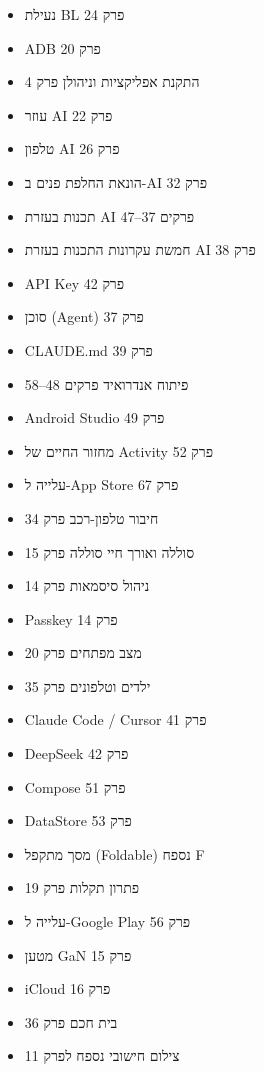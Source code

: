 


\begin{itemize}
  \item נעילת BL פרק 24
  \item ADB פרק 20
  \item התקנת אפליקציות וניהולן פרק 4
  \item עוזר AI פרק 22
  \item טלפון AI פרק 26
  \item הונאת החלפת פנים ב-AI פרק 32
  \item תכנות בעזרת AI פרקים 37–47
  \item חמשת עקרונות התכנות בעזרת AI פרק 38
  \item API Key פרק 42
  \item סוכן (Agent) פרק 37
  \item CLAUDE.md פרק 39
  \item פיתוח אנדרואיד פרקים 48–58
  \item Android Studio פרק 49
  \item מחזור החיים של Activity פרק 52
  \item עלייה ל-App Store פרק 67
\end{itemize}


\begin{itemize}
  \item חיבור טלפון-רכב פרק 34
  \item סוללה ואורך חיי סוללה פרק 15
  \item ניהול סיסמאות פרק 14
  \item Passkey פרק 14
  \item מצב מפתחים פרק 20
  \item ילדים וטלפונים פרק 35
  \item Claude Code / Cursor פרק 41
  \item DeepSeek פרק 42
  \item Compose פרק 51
  \item DataStore פרק 53
\end{itemize}


\begin{itemize}
  \item מסך מתקפל (Foldable) נספח F
  \item פתרון תקלות פרק 19
  \item עלייה ל-Google Play פרק 56
  \item מטען GaN פרק 15
  \item iCloud פרק 16
  \item בית חכם פרק 36
  \item צילום חישובי נספח לפרק 11
\end{itemize}

